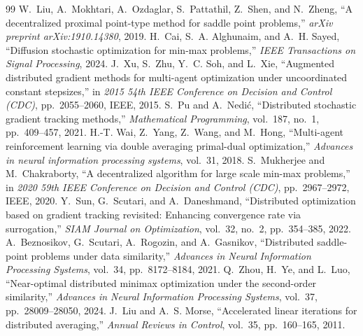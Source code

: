 \documentclass[10pt,a4paper]{amsart}
\begin{document}
\begin{thebibliography}{99}
 W.~Liu, A.~Mokhtari, A.~Ozdaglar, S.~Pattathil, Z.~Shen, and N.~Zheng, ``A decentralized proximal point-type method for saddle point problems,'' {\em arXiv preprint arXiv:1910.14380}, 2019.
 H.~Cai, S.~A. Alghunaim, and A.~H. Sayed, ``Diffusion stochastic optimization for min-max problems,'' {\em IEEE Transactions on Signal Processing}, 2024.
 J.~Xu, S.~Zhu, Y.~C. Soh, and L.~Xie, ``Augmented distributed gradient methods for multi-agent optimization under uncoordinated constant stepsizes,'' in {\em 2015 54th IEEE Conference on Decision and Control (CDC)}, pp.~2055--2060, IEEE, 2015.
 S.~Pu and A.~Nedi{\'c}, ``Distributed stochastic gradient tracking methods,'' {\em Mathematical Programming}, vol.~187, no.~1, pp.~409--457, 2021.
 H.-T. Wai, Z.~Yang, Z.~Wang, and M.~Hong, ``Multi-agent reinforcement learning via double averaging primal-dual optimization,'' {\em Advances in neural information processing systems}, vol.~31, 2018.
 S.~Mukherjee and M.~Chakraborty, ``A decentralized algorithm for large scale min-max problems,'' in {\em 2020 59th IEEE Conference on Decision and Control (CDC)}, pp.~2967--2972, IEEE, 2020.
 Y.~Sun, G.~Scutari, and A.~Daneshmand, ``Distributed optimization based on gradient tracking revisited: Enhancing convergence rate via surrogation,'' {\em SIAM Journal on Optimization}, vol.~32, no.~2, pp.~354--385, 2022.
 A.~Beznosikov, G.~Scutari, A.~Rogozin, and A.~Gasnikov, ``Distributed saddle-point problems under data similarity,'' {\em Advances in Neural Information Processing Systems}, vol.~34, pp.~8172--8184, 2021.
 Q.~Zhou, H.~Ye, and L.~Luo, ``Near-optimal distributed minimax optimization under the second-order similarity,'' {\em Advances in Neural Information Processing Systems}, vol.~37, pp.~28009--28050, 2024.
 J.~Liu and A.~S. Morse, ``Accelerated linear iterations for distributed averaging,'' {\em Annual Reviews in Control}, vol.~35, pp.~160--165, 2011.
\end{thebibliography}
\end{document}
